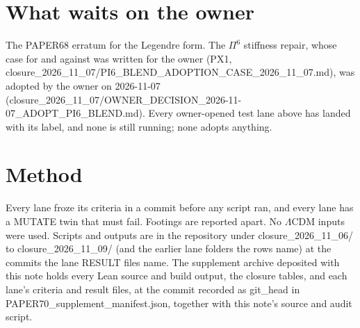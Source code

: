 \documentclass[10pt]{article}
\begin{document}
\section{What waits on the owner}
The PAPER68 erratum for the Legendre form. The $\Pi^6$ stiffness repair, whose case for and against was written for the owner (PX1, closure\_2026\_11\_07/PI6\_BLEND\_ADOPTION\_CASE\_2026\_11\_07.md), was adopted by the owner on 2026-11-07 (closure\_2026\_11\_07/OWNER\_DECISION\_2026-11-07\_ADOPT\_PI6\_BLEND.md).
Every owner-opened test lane above has landed with its label, and none is still running; none adopts anything.

\section*{Method}
Every lane froze its criteria in a commit before any script ran, and every lane has a MUTATE twin that must fail. Footings are reported apart. No $\Lambda$CDM inputs were used. Scripts and outputs are in the repository under closure\_2026\_11\_06/ to closure\_2026\_11\_09/ (and the earlier lane folders the rows name) at the commits the lane RESULT files name. The supplement archive deposited with this note holds every Lean source and build output, the closure tables, and each lane's criteria and result files, at the commit recorded as git\_head in PAPER70\_supplement\_manifest.json, together with this note's source and audit script.
\end{document}
